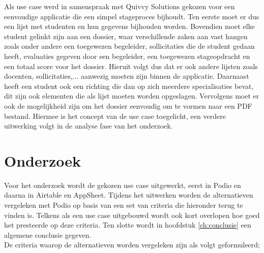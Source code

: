 Als use case werd in samenspraak met Quivvy Solutions gekozen voor een eenvoudige applicatie die een simpel stageproces bijhoudt. Ten eerste moet er dus een lijst met studenten en hun gegevens bijhouden worden. Bovendien moet elke student gelinkt zijn aan een dossier, waar verschillende zaken aan vast hangen zoals onder andere een toegewezen begeleider, sollicitaties die de student gedaan heeft, evaluaties gegeven door een begeleider, een toegewezen stageopdracht en een totaal score voor het dossier. Hieruit volgt dus dat er ook andere lijsten zoals docenten, sollicitaties,$\ldots$ aanwezig moeten zijn binnen de applicatie. Daarnaast heeft een student ook een richting die dan op zich meerdere specialisaties bevat, dit zijn ook elementen die als lijst moeten worden opgeslagen. Vervolgens moet er ook de mogelijkheid zijn om het dossier eenvoudig om te vormen naar een PDF bestand. Hiermee is het concept van de use case toegelicht, een verdere uitwerking volgt in de analyse fase van het onderzoek. \\

\section{Onderzoek} 

Voor het onderzoek wordt de gekozen use case uitgewerkt, eerst in Podio en daarna in Airtable en AppSheet. Tijdens het uitwerken worden de alternatieven vergeleken met Podio op basis van een set van criteria die hieronder terug te vinden is. Telkens als een use case uitgebouwd wordt ook kort overlopen hoe goed het presteerde op deze criteria. Ten slotte wordt in hoofdstuk \ref{ch:conclusie} een algemene conclusie gegeven. \\

De criteria waarop de alternatieven worden vergeleken zijn als volgt geformuleerd;

